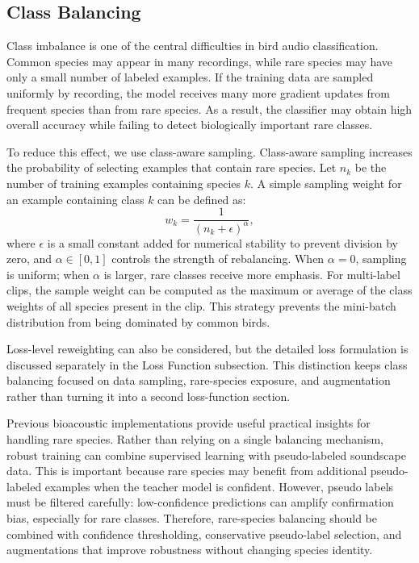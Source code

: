 \documentclass[a4paper,12pt]{article}
\begin{document}
\subsection{Class Balancing}

Class imbalance is one of the central difficulties in bird audio classification. Common species may appear in many recordings, while rare species may have only a small number of labeled examples. If the training data are sampled uniformly by recording, the model receives many more gradient updates from frequent species than from rare species. As a result, the classifier may obtain high overall accuracy while failing to detect biologically important rare classes.

To reduce this effect, we use class-aware sampling. Class-aware sampling increases the probability of selecting examples that contain rare species. Let $n_k$ be the number of training examples containing species $k$. A simple sampling weight for an example containing class $k$ can be defined as:
\[
w_k = \frac{1}{(n_k + \epsilon)^\alpha},
\]
where $\epsilon$ is a small constant added for numerical stability to prevent division by zero, and $\alpha\in[0,1]$ controls the strength of rebalancing. When $\alpha=0$, sampling is uniform; when $\alpha$ is larger, rare classes receive more emphasis. For multi-label clips, the sample weight can be computed as the maximum or average of the class weights of all species present in the clip. This strategy prevents the mini-batch distribution from being dominated by common birds.

Loss-level reweighting can also be considered, but the detailed loss formulation is discussed separately in the Loss Function subsection. This distinction keeps class balancing focused on data sampling, rare-species exposure, and augmentation rather than turning it into a second loss-function section.

Previous bioacoustic implementations provide useful practical insights for handling rare species. Rather than relying on a single balancing mechanism, robust training can combine supervised learning with pseudo-labeled soundscape data. This is important because rare species may benefit from additional pseudo-labeled examples when the teacher model is confident. However, pseudo labels must be filtered carefully: low-confidence predictions can amplify confirmation bias, especially for rare classes. Therefore, rare-species balancing should be combined with confidence thresholding, conservative pseudo-label selection, and augmentations that improve robustness without changing species identity.
\end{document}
